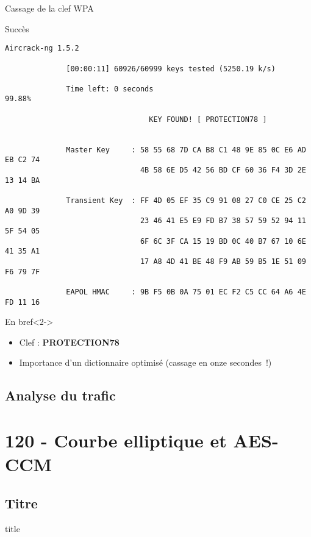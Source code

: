 \documentclass[10pt,sans,usenames,dvipsnames,french,compress]{beamer}
\begin{document}
\begin{frame}[fragile]{Cassage de la clef WPA}
	\vspace{-1mm}
	\begin{block}{Succès}
		\vspace{-3mm}
		\begin{lstlisting}[style=Term]
		                              Aircrack-ng 1.5.2 

		      [00:00:11] 60926/60999 keys tested (5250.19 k/s) 

		      Time left: 0 seconds                                      99.88%

		                         KEY FOUND! [ PROTECTION78 ]


		      Master Key     : 58 55 68 7D CA B8 C1 48 9E 85 0C E6 AD EB C2 74 
		                       4B 58 6E D5 42 56 BD CF 60 36 F4 3D 2E 13 14 BA 

		      Transient Key  : FF 4D 05 EF 35 C9 91 08 27 C0 CE 25 C2 A0 9D 39 
		                       23 46 41 E5 E9 FD B7 38 57 59 52 94 11 5F 54 05 
		                       6F 6C 3F CA 15 19 BD 0C 40 B7 67 10 6E 41 35 A1 
		                       17 A8 4D 41 BE 48 F9 AB 59 B5 1E 51 09 F6 79 7F 

		      EAPOL HMAC     : 9B F5 0B 0A 75 01 EC F2 C5 CC 64 A6 4E FD 11 16
		\end{lstlisting}
		\vspace{-2mm}

	\end{block}
	\vspace{-1mm}
	\begin{exampleblock}{En bref}<2->
		\begin{itemize}
			\item Clef : \textbf{PROTECTION78}
			\item<3-> Importance d'un dictionnaire optimisé (cassage en onze secondes !)
		\end{itemize}
	\end{exampleblock}
\end{frame}


\subsection{Analyse du trafic}


\section{120 - Courbe elliptique et AES-CCM}
\subsection{Titre}
\begin{frame}
	\begin{beamercolorbox}[sep=8pt,center]{title}
	\end{beamercolorbox}
\end{frame}
\end{document}
